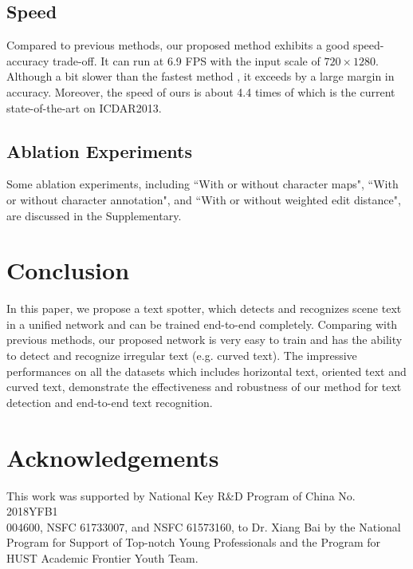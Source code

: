 \documentclass[runningheads]{llncs}
\begin{document}
\subsection{Speed}

Compared to previous methods,  our proposed method exhibits a good speed-accuracy trade-off. It can run at 6.9 FPS with the input scale of $720 \times 1280$. Although a bit slower than the fastest method \cite{Busta_2017_ICCV},  it exceeds \cite{Busta_2017_ICCV} by a large margin in accuracy. Moreover, the speed of ours is about 4.4 times of \cite{Li_2017_ICCV} which is the current state-of-the-art on ICDAR2013.

\subsection{Ablation Experiments}
Some ablation experiments, including ``With or without character maps", ``With or without character annotation", and ``With or without weighted edit distance", are discussed in the Supplementary.

\section{Conclusion}
In this paper, we propose a text spotter, which detects and recognizes scene text in a unified network and can be trained end-to-end completely. Comparing with previous methods, our proposed network is very easy to train and has the ability to detect and recognize irregular text (e.g. curved text). The impressive  performances on all the datasets which  includes  horizontal text,  oriented text and curved text,  demonstrate the effectiveness and robustness of our method for text detection and end-to-end text recognition.

\section*{Acknowledgements}
This work was supported by National Key R\&D Program of China No. 2018YFB1\\004600, NSFC 61733007, and NSFC 61573160, to Dr. Xiang Bai by the National Program for Support of Top-notch Young Professionals and the Program for HUST Academic Frontier Youth Team.
%
%
%


%
\end{document}
